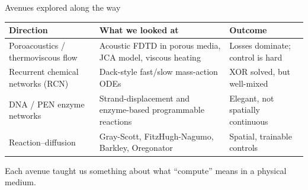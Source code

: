 \documentclass[aspectratio=169,11pt]{beamer}
\begin{document}
\begin{frame}{Avenues explored along the way}

\begin{table}
\centering
\footnotesize
\begin{tabular}{>{\raggedright\arraybackslash}p{2.5cm}>{\raggedright\arraybackslash}p{5.5cm}>{\raggedright\arraybackslash}p{2.5cm}}
\toprule
\textbf{Direction} & \textbf{What we looked at} & \textbf{Outcome} \\
\midrule
Poroacoustics / thermoviscous flow & Acoustic FDTD in porous media, JCA model, viscous heating & Losses dominate; control is hard \\
Recurrent chemical networks (RCN) & Dack-style fast/slow mass-action ODEs & XOR solved, but well-mixed \\
DNA / PEN enzyme networks & Strand-displacement and enzyme-based programmable reactions & Elegant, not spatially continuous \\
Reaction--diffusion & Gray-Scott, FitzHugh-Nagumo, Barkley, Oregonator & Spatial, trainable controls \\
\bottomrule
\end{tabular}
\end{table}

\vspace{0.2cm}
\centering
\footnotesize
Each avenue taught us something about what ``compute'' means in a physical medium.

\end{frame}
\end{document}
